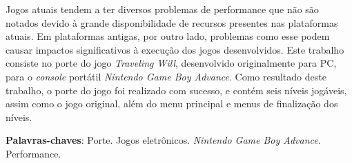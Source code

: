 \begin{resumo}

  Jogos atuais tendem a ter diversos problemas de performance que não são notados devido à grande disponibilidade de recursos presentes nas plataformas atuais. Em plataformas antigas, por outro lado, problemas como esse podem causar impactos significativos à execução dos jogos desenvolvidos. Este trabalho consiste no porte do jogo \textit{Traveling Will}, desenvolvido originalmente para PC, para o \textit{console} portátil \textit{Nintendo Game Boy Advance}. Como resultado deste trabalho, o porte do jogo foi realizado com sucesso, e contém seis níveis jogáveis, assim como o jogo original, além do menu principal e menus de finalização dos níveis.

  \vspace{\onelineskip}

  \noindent
  \textbf{Palavras-chaves}: Porte. Jogos eletrônicos. \textit{Nintendo Game Boy Advance}. Performance.
\end{resumo}
